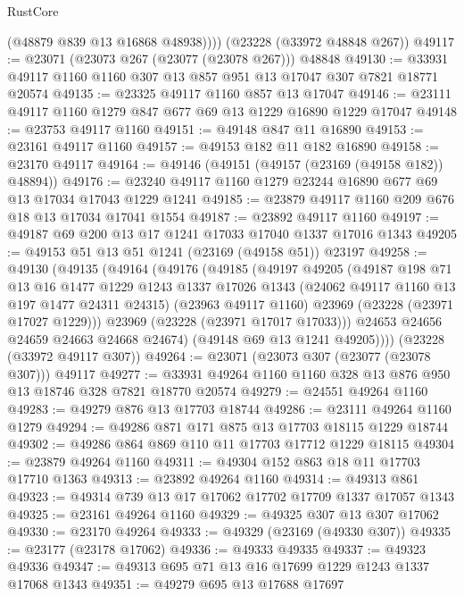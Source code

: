 \begin{lexlean}{RustCore}
\begin{coremodule}
          (@48879 @839 @13 @16868 @48938))))
    (@23228 (@33972 @48848 @267))
@49117 := @23071 (@23073 @267 (@23077 (@23078 @267))) @48848
@49130 := @33931 @49117 @1160 @1160 @307 @13 @857 @951 @13 @17047 @307 @7821 @18771 @20574
@49135 := @23325 @49117 @1160 @857 @13 @17047
@49146 := @23111 @49117 @1160 @1279 @847 @677 @69 @13 @1229 @16890 @1229 @17047
@49148 := @23753 @49117 @1160
@49151 := @49148 @847 @11 @16890
@49153 := @23161 @49117 @1160
@49157 := @49153 @182 @11 @182 @16890
@49158 := @23170 @49117
@49164 := @49146 (@49151 (@49157 (@23169 (@49158 @182)) @48894))
@49176 := @23240 @49117 @1160 @1279 @23244 @16890 @677 @69 @13 @17034 @17043 @1229 @1241
@49185 := @23879 @49117 @1160 @209 @676 @18 @13 @17034 @17041 @1554
@49187 := @23892 @49117 @1160
@49197 := @49187 @69 @200 @13 @17 @1241 @17033 @17040 @1337 @17016 @1343
@49205 := @49153 @51 @13 @51 @1241 (@23169 (@49158 @51)) @23197
@49258 := @49130
    (@49135
      (@49164
        (@49176
          (@49185
            (@49197
              @49205
              (@49187
                @198
                @71
                @13
                @16
                @1477
                @1229
                @1243
                @1337
                @17026
                @1343
                (@24062 @49117 @1160 @13 @197 @1477 @24311 @24315)
                (@23963 @49117 @1160)
                @23969
                (@23228 (@23971 @17027 @1229)))
              @23969
              (@23228 (@23971 @17017 @17033)))
            @24653
            @24656
            @24659
            @24663
            @24668
            @24674)
          (@49148 @69 @13 @1241 @49205))))
    (@23228 (@33972 @49117 @307))
@49264 := @23071 (@23073 @307 (@23077 (@23078 @307))) @49117
@49277 := @33931 @49264 @1160 @1160 @328 @13 @876 @950 @13 @18746 @328 @7821 @18770 @20574
@49279 := @24551 @49264 @1160
@49283 := @49279 @876 @13 @17703 @18744
@49286 := @23111 @49264 @1160 @1279
@49294 := @49286 @871 @171 @875 @13 @17703 @18115 @1229 @18744
@49302 := @49286 @864 @869 @110 @11 @17703 @17712 @1229 @18115
@49304 := @23879 @49264 @1160
@49311 := @49304 @152 @863 @18 @11 @17703 @17710 @1363
@49313 := @23892 @49264 @1160
@49314 := @49313 @861
@49323 := @49314 @739 @13 @17 @17062 @17702 @17709 @1337 @17057 @1343
@49325 := @23161 @49264 @1160
@49329 := @49325 @307 @13 @307 @17062
@49330 := @23170 @49264
@49333 := @49329 (@23169 (@49330 @307))
@49335 := @23177 (@23178 @17062)
@49336 := @49333 @49335
@49337 := @49323 @49336
@49347 := @49313 @695 @71 @13 @16 @17699 @1229 @1243 @1337 @17068 @1343
@49351 := @49279 @695 @13 @17688 @17697

\end{coremodule}
\end{lexlean}
